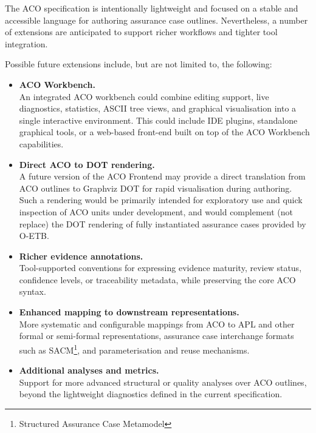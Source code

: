 \documentclass[11pt]{article}
\begin{document}
The ACO specification is intentionally lightweight and focused on a stable
and accessible language for authoring assurance case outlines. Nevertheless, a number
of extensions are anticipated to support richer workflows and tighter tool
integration.

Possible future extensions include, but are not limited to, the following:

\begin{itemize}[leftmargin=2em]
  \item \textbf{ACO Workbench.} \\
        An integrated ACO workbench could combine editing support, live
        diagnostics, statistics, ASCII tree views, and graphical visualisation into a
        single interactive environment. This could include IDE plugins,
        standalone graphical tools, or a web-based front-end built on top of the
        ACO Workbench capabilities.

  \item \textbf{Direct ACO to DOT rendering.} \\
        A future version of the ACO Frontend may provide a direct translation
        from ACO outlines to Graphviz DOT for rapid visualisation during
        authoring. Such a rendering would be primarily intended for exploratory
        use and quick inspection of ACO units under development, and would complement (not replace) the DOT
        rendering of fully instantiated assurance cases provided by O-ETB.

  \item \textbf{Richer evidence annotations.} \\
        Tool-supported conventions for expressing evidence maturity, review
        status, confidence levels, or traceability metadata, while preserving
        the core ACO syntax.

  \item \textbf{Enhanced mapping to downstream representations.} \\
        More systematic and configurable mappings from ACO to APL and other
        formal or semi-formal representations, assurance case interchange formats such as SACM\footnote{Structured Assurance Case Metamodel}, and parameterisation and
        reuse mechanisms.

  \item \textbf{Additional analyses and metrics.} \\
        Support for more advanced structural or quality analyses over ACO
        outlines, beyond the lightweight diagnostics defined in the current
        specification.
\end{itemize}
\end{document}
